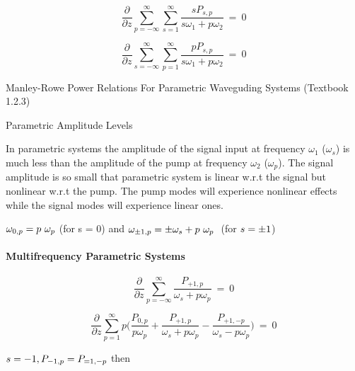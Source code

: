 \documentclass{article}
\begin{document}
\begin{equation}
\frac{\partial}{\partial{z}}\sum_{p=-\infty}^{\infty}\sum_{s=1}^{\infty} 
\frac{s P_{s,p}}{ s\omega_1 + p\omega_2}
~=~0
\end{equation}

\begin{equation}
\frac{\partial}{\partial{z}}\sum_{s=-\infty}^{\infty}\sum_{p=1}^{\infty}
\frac{p P_{s,p}}{ s\omega_1 + p\omega_2}
~=~0
\end{equation}

\vspace{0.5cm}

Manley-Rowe Power Relations For Parametric Waveguding Systems (Textbook 1.2.3) \newline

Parametric Amplitude Levels \newline 

In parametric systems the amplitude of the signal input at frequency $\omega_1$ ($\omega_s$) is much less than the amplitude of the pump at frequency $\omega_2$ ($\omega_p$). The signal amplitude is so small that parametric system is linear w.r.t the signal but nonlinear w.r.t the pump. The pump modes will experience nonlinear effects while the signal modes will experience linear ones. \newline

$ \mathlarger{\omega_{0,p} = p~\omega_p}$ (for s = 0) and $\mathlarger{\omega_{\pm1,p} = \pm\omega_s + p~\omega_p~}$ (for $\mathlarger{s = \pm 1}$)

\newpage

\paragraph{Multifrequency Parametric Systems}

\begin{equation}
\frac{\partial}{\partial{z}}\sum_{p=-\infty}^{\infty}
\frac{P_{+1,p}}{ \omega_s + p\omega_p}
~=~0
\end{equation}


\begin{equation}
	\frac{\partial}{\partial{z}}\sum_{p=1}^{\infty}
	p \Bigg(
	\frac{P_{0,p}}{p\omega_p} + \frac{P_{+1,p}}{\omega_s+p\omega_p}-\frac{P_{+1,-p}}{\omega_s-p\omega_p}
	\Bigg)
	~=~0
\end{equation}

$ \mathlarger{s = -1, P_{-1,p} = P_{=1,-p} }$ then \newline
\end{document}
